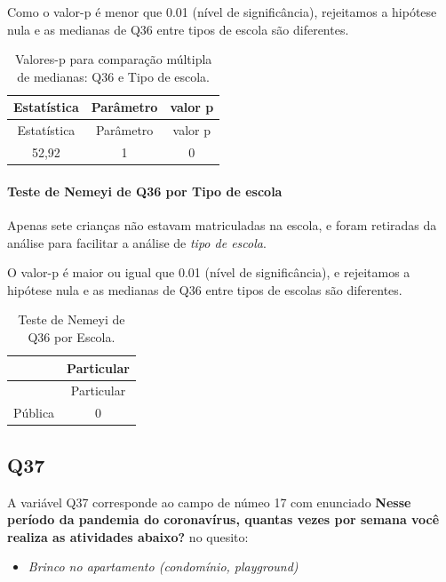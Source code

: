 \documentclass[]{article}
\providecommand{\tightlist}{%
  \setlength{\itemsep}{0pt}\setlength{\parskip}{0pt}}
\let\oldparagraph\paragraph
\renewcommand{\paragraph}[1]{\oldparagraph{#1}\mbox{}}
\begin{document}
Como o valor-p é menor que 0.01 (nível de significância), rejeitamos a hipótese nula e as medianas de Q36 entre tipos de escola são diferentes.

\begin{longtable}[]{@{}ccc@{}}
\caption{\label{tab:unnamed-chunk-1358}Valores-p para comparação múltipla de medianas: Q36 e Tipo de escola.}\tabularnewline
\toprule
Estatística & Parâmetro & valor p\tabularnewline
\midrule
\endfirsthead
\toprule
Estatística & Parâmetro & valor p\tabularnewline
\midrule
\endhead
52,92 & 1 & 0\tabularnewline
\bottomrule
\end{longtable}

\hypertarget{teste-de-nemeyi-de-q36-por-tipo-de-escola}{%
\paragraph{Teste de Nemeyi de Q36 por Tipo de escola}\label{teste-de-nemeyi-de-q36-por-tipo-de-escola}}

Apenas sete crianças não estavam matriculadas na escola, e foram retiradas da análise para facilitar a análise de \emph{tipo de escola}.

O valor-p é maior ou igual que 0.01 (nível de significância), e rejeitamos a hipótese nula e as medianas de Q36 entre tipos de escolas são diferentes.

\begin{longtable}[]{@{}lc@{}}
\caption{\label{tab:unnamed-chunk-1360}Teste de Nemeyi de Q36 por Escola.}\tabularnewline
\toprule
& Particular\tabularnewline
\midrule
\endfirsthead
\toprule
& Particular\tabularnewline
\midrule
\endhead
Pública & 0\tabularnewline
\bottomrule
\end{longtable}

\cleardoublepage

\hypertarget{q37}{%
\subsection{Q37}\label{q37}}

A variável Q37 corresponde ao campo de númeo 17 com enunciado \textbf{Nesse período da pandemia do coronavírus, quantas vezes por semana você realiza as atividades abaixo?} no quesito:

\begin{itemize}
\tightlist
\item
  \emph{Brinco no apartamento (condomínio, playground)}
\end{itemize}
\end{document}
